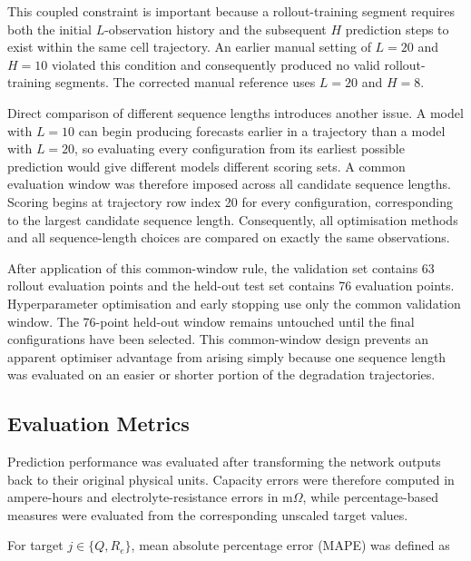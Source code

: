 \documentclass[a4paper,fleqn]{cas-sc}
\begin{document}
This coupled constraint is important because a rollout-training segment requires both the initial $L$-observation history and the subsequent $H$ prediction steps to exist within the same cell trajectory. An earlier manual setting of $L=20$ and $H=10$ violated this condition and consequently produced no valid rollout-training segments. The corrected manual reference uses $L=20$ and $H=8$.

Direct comparison of different sequence lengths introduces another issue. A model with $L=10$ can begin producing forecasts earlier in a trajectory than a model with $L=20$, so evaluating every configuration from its earliest possible prediction would give different models different scoring sets. A common evaluation window was therefore imposed across all candidate sequence lengths. Scoring begins at trajectory row index 20 for every configuration, corresponding to the largest candidate sequence length. Consequently, all optimisation methods and all sequence-length choices are compared on exactly the same observations.

After application of this common-window rule, the validation set contains 63 rollout evaluation points and the held-out test set contains 76 evaluation points. Hyperparameter optimisation and early stopping use only the common validation window. The 76-point held-out window remains untouched until the final configurations have been selected. This common-window design prevents an apparent optimiser advantage from arising simply because one sequence length was evaluated on an easier or shorter portion of the degradation trajectories.



\subsection{Evaluation Metrics}
\label{sec:evaluation_metrics}

Prediction performance was evaluated after transforming the network outputs back to their original physical units. Capacity errors were therefore computed in ampere-hours and electrolyte-resistance errors in m$\Omega$, while percentage-based measures were evaluated from the corresponding unscaled target values.

For target $j \in \{Q,R_e\}$, mean absolute percentage error (MAPE) was defined as
\end{document}
